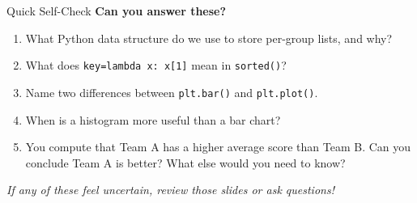 \documentclass{csbeamer}
\begin{document}
\begin{frame}{Quick Self-Check}
    \textbf{Can you answer these?}

    \vspace{1em}

    \begin{enumerate}
        \item What Python data structure do we use to store per-group lists, and why?
        \item What does \texttt{key=lambda x: x[1]} mean in \texttt{sorted()}?
        \item Name two differences between \texttt{plt.bar()} and \texttt{plt.plot()}.
        \item When is a histogram more useful than a bar chart?
        \item You compute that Team A has a higher average score than Team B. Can you conclude Team A is better? What else would you need to know?
    \end{enumerate}

    \vspace{1em}

    \pause

    \begin{center}
        \textit{If any of these feel uncertain, review those slides or ask questions!}
    \end{center}
\end{frame}
\end{document}
